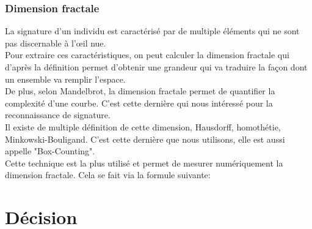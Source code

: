 \documentclass[fontsize=12pt, twoside=no]{scrartcl} %
\begin{document}
\section{Dimension fractale}
La signature d'un individu est caractérisé par de multiple éléments qui ne sont pas discernable à l'œil nue.\\

Pour extraire ces caractéristiques, on peut calculer la dimension fractale qui d'après la définition permet d'obtenir une grandeur qui va traduire la façon dont un ensemble va remplir l'espace.\\

De plus, selon Mandelbrot, la dimension fractale permet de quantifier la complexité d'une courbe. C'est cette dernière qui nous intéressé pour la reconnaissance de signature.\\

Il existe de multiple définition de cette dimension, Hausdorff, homothétie, Minkowski-Bouligand. C'est cette dernière que nous utilisons, elle est aussi appelle "Box-Counting".\\

Cette technique est la plus utilisé et permet de mesurer numériquement la dimension fractale. Cela se fait via la formule suivante:

\vspace{0.3cm}
\begin{center}
\end{center}


\part{Décision}
\end{document}
